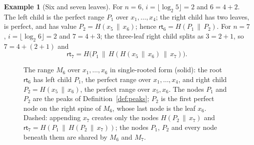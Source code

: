 \documentclass[11pt,a4paper]{article}
\theoremstyle{definition}
\newtheorem{example}[theorem]{Example}
\begin{document}
\begin{example}[Six and seven leaves]\label{ex:mmr-small}
For $n=6$, $i=\lfloor\log_2 5\rfloor=2$ and $6=4+2$. The left child is the
perfect range $P_1$ over $x_1,\dots,x_4$; the right child has two leaves, is
perfect, and has value $P_2=H(x_5\,\|\,x_6)$; hence
$\mathsf{rt}_6=H(P_1\,\|\,P_2)$. For $n=7$, $i=\lfloor\log_2 6\rfloor=2$ and
$7=4+3$; the three-leaf right child splits as $3=2+1$, so $7=4+(2+1)$ and
\[
  \mathsf{rt}_7=H\bigl(P_1\,\|\,H(H(x_5\,\|\,x_6)\,\|\,x_7)\bigr).
\]
\end{example}

\begin{figure}[t]
\centering
{}
\caption{The range $M_6$ over $x_1,\dots,x_6$ in single-rooted form (solid):
the root $\mathsf{rt}_6$ has left child $P_1$, the perfect range over
$x_1,\dots,x_4$, and right child $P_2=H(x_5\,\|\,x_6)$, the perfect range
over $x_5,x_6$. The nodes $P_1$ and $P_2$ are the peaks of
Definition~\ref{def:peaks}; $P_2$ is the first perfect node on the right
spine of $M_6$, whose last node is the leaf $x_6$. Dashed: appending $x_7$
creates only the nodes $H(P_2\,\|\,x_7)$ and
$\mathsf{rt}_7=H(P_1\,\|\,H(P_2\,\|\,x_7))$; the nodes $P_1$, $P_2$ and every
node beneath them are shared by $M_6$ and $M_7$.}
\label{fig:mmr}
\end{figure}
\end{document}
